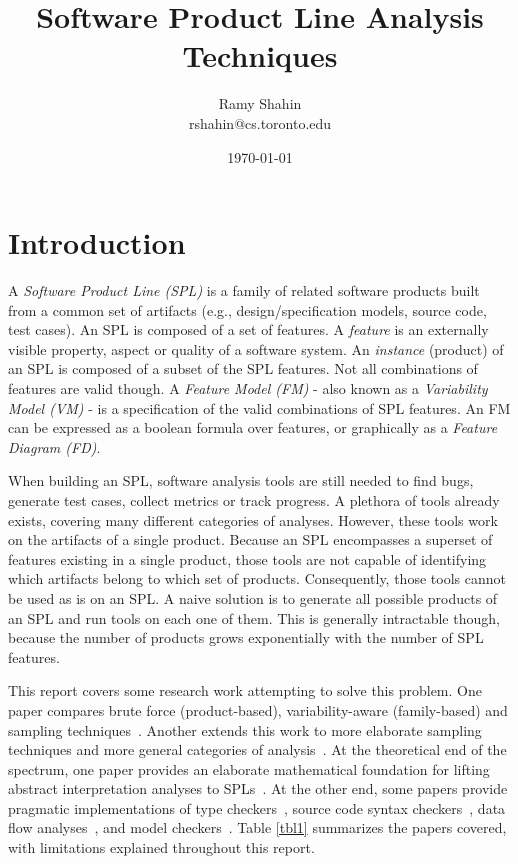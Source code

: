 \documentclass[11pt]{article}
\title{Software Product Line Analysis Techniques}
\author{Ramy Shahin \\ rshahin@cs.toronto.edu}
\date{\today}                                           %
\newcommand{\term}[1] {\emph{#1}}
\begin{document}
\maketitle


\section{Introduction}
A \term{Software Product Line (SPL)} is a family of related software products built from a common set of artifacts (e.g., design/specification models, source code, test cases). An SPL is composed of a set of features. A \term{feature} is an externally visible property, aspect or quality of a software system. An \term{instance} (product) of an SPL is composed of a subset of the SPL features. Not all combinations of features are valid though. A \term{Feature Model (FM)} - also known as a \term{Variability Model (VM)} - is a specification of the valid combinations of SPL features. An FM can be expressed as a boolean formula over features, or graphically as a \term{Feature Diagram (FD)}.

When building an SPL, software analysis tools are still needed to find bugs, generate test cases, collect metrics or track progress. A plethora of tools already exists, covering many different categories of analyses. However, these tools work on the artifacts of a single product. Because an SPL encompasses a superset of features existing in a single product, those tools are not capable of identifying which artifacts belong to which set of products. Consequently, those tools cannot be used as is on an SPL. A naive solution is to generate all possible products of an SPL and run tools on each one of them. This is generally intractable though, because the number of products grows exponentially with the number of SPL features.

This report covers some research work attempting to solve this problem. One paper compares brute force (product-based), variability-aware (family-based) and sampling techniques~\cite{Apel:2013}. Another extends this work to more elaborate sampling techniques and more general categories of analysis~\cite{Liebig:2013}. At the theoretical end of the spectrum, one paper provides an elaborate mathematical foundation for lifting abstract interpretation analyses to SPLs~\cite{Midtgaard:2015}. At the other end, some papers provide pragmatic implementations of type checkers~\cite{Kastner:2012}, source code syntax checkers~\cite{Gazzillo:2012}, data flow analyses~\cite{Bodden:2013}, and model checkers~\cite{Classen:2013}. Table \ref{tbl1} summarizes the papers covered, with limitations explained throughout this report.
\end{document}
